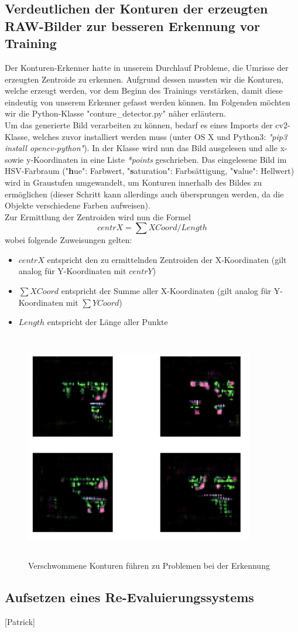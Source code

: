 \subsection{Verdeutlichen der Konturen der erzeugten RAW-Bilder zur besseren Erkennung vor Training}
Der Konturen-Erkenner hatte in unserem Durchlauf Probleme, die Umrisse der erzeugten Zentroide zu erkennen. Aufgrund dessen mussten wir die Konturen, welche erzeugt werden, vor dem Beginn des Trainings verstärken, damit diese eindeutig von unserem Erkenner gefasst werden können. Im Folgenden möchten wir die Python-Klasse "conture\_detector.py" näher erläutern. \\
Um das generierte Bild verarbeiten zu können, bedarf es eines Imports der cv2-Klasse, welches zuvor installiert werden muss (unter OS X und Python3: \textit{"pip3 install opencv-python"}). In der Klasse wird nun das Bild ausgelesen und alle x- sowie y-Koordinaten in eine Liste \textit{*points} geschrieben. Das eingelesene Bild im HSV-Farbraum ("\textbf{h}ue": Farbwert, "\textbf{s}aturation": Farbsättigung, "\textbf{v}alue": Hellwert) wird in Graustufen umgewandelt, um Konturen innerhalb des Bildes zu ermöglichen (dieser Schritt kann allerdings auch übersprungen werden, da die Objekte verschiedene Farben aufweisen). \\ Zur Ermittlung der Zentroiden wird nun die Formel \[centrX = \sum XCoord / Length\] wobei folgende Zuweisungen gelten:
\begin{itemize}
	\item \(centrX\) entspricht den zu ermittelnden Zentroiden der X-Koordinaten (gilt analog für Y-Koordinaten mit \(centrY\))
	\item  \(\sum XCoord\) entspricht der Summe aller X-Koordinaten (gilt analog für Y-Koordinaten mit \(\sum YCoord\))
	\item  \(Length\) entspricht der Länge aller Punkte
\end{itemize}
\begin{figure}
	\centering
	\includegraphics[height=10cm, width=10cm]{img/blurry_attempts.png}
	\caption{Verschwommene Konturen führen zu Problemen bei der Erkennung}
\end{figure}
\subsection{Aufsetzen eines Re-Evaluierungssystems}
[Patrick]